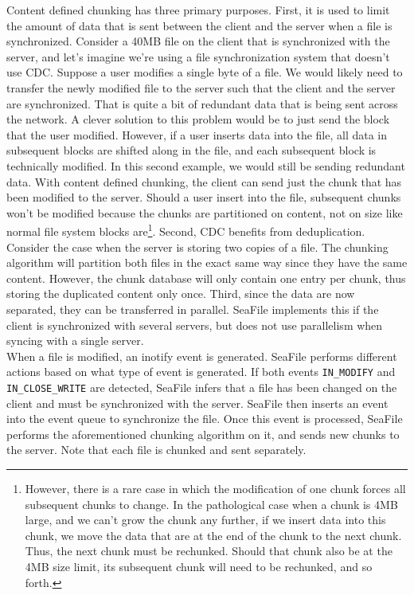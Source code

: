 \documentclass[table]{article}
\newcommand{\code}[1]{\texttt{#1}}
\begin{document}
\begin{multicols}{2}
Content defined chunking has three primary purposes. First, it is used to limit the amount of data that is sent between the client and the server when a file is synchronized. Consider a 40MB file on the client that is synchronized with the server, and let's imagine we're using a file synchronization system that doesn't use CDC. Suppose a user modifies a single byte of a file. We would likely need to transfer the newly modified file to the server such that the client and the server are synchronized. That is quite a bit of redundant data that is being sent across the network. A clever solution to this problem would be to just send the block that the user modified. However, if a user inserts data into the file, all data in subsequent blocks are shifted along in the file, and each subsequent block is technically modified. In this second example, we would still be sending redundant data. With content defined chunking, the client can send just the chunk that has been modified to the server. Should a user insert into the file, subsequent chunks won't be modified because the chunks are partitioned on content, not on size like normal file system blocks are\footnote{However, there is a rare case in which the modification of one chunk forces all subsequent chunks to change. In the pathological case when a chunk is 4MB large, and we can't grow the chunk any further, if we insert data into this chunk, we move the data that are at the end of the chunk to the next chunk. Thus, the next chunk must be rechunked. Should that chunk also be at the 4MB size limit, its subsequent chunk will need to be rechunked, and so forth.}. Second, CDC benefits from deduplication. Consider the case when the server is storing two copies of a file. The chunking algorithm will partition both files in the exact same way since they have the same content. However, the chunk database will only contain one entry per chunk, thus storing the duplicated content only once. Third, since the data are now separated, they can be transferred in parallel. SeaFile implements this if the client is synchronized with several servers, but does not use parallelism when syncing with a single server\cite{SeaFile-data-model}.\\

When a file is modified, an inotify event is generated. SeaFile performs different actions based on what type of event is generated. If both events \code{IN\_MODIFY} and \code{IN\_CLOSE\_WRITE} are detected, SeaFile infers that a file has been changed on the client and must be synchronized with the server. SeaFile then inserts an event into the event queue to synchronize the file. Once this event is processed, SeaFile performs the aforementioned chunking algorithm on it, and sends new chunks to the server. Note that each file is chunked and sent separately.


\end{multicols}
\end{document}
